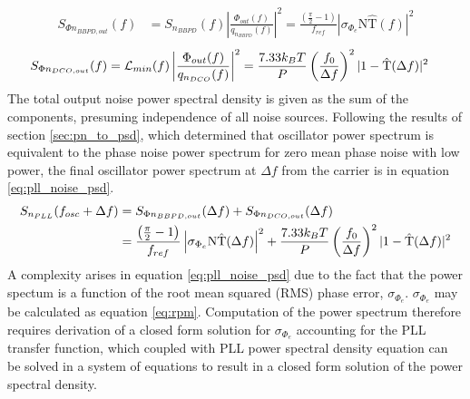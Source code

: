 		\begin{align}\label{eq:out_psd_bbpd_pll}
			S_{\Phi n_{BBPD,out}}(f) &= S_{n_{BBPD}}(f)\left|\frac{\Phi_{out}(f)}{q_{n_{BBPD}}(f)}\right|^2 = \frac{\left(\frac{\pi}{2}-1\right)}{f_{ref}}\left|\sigma_{\Phi_e}\mathrm{N}\hat{\mathrm{T}}(f)\right|^2
		\end{align}
		\begin{align}\label{eq:out_psd_dco_pll}
			S_{\Phi n_{DCO,out}}(f) &= \mathcal{L}_{min}(f)\left|\frac{\Phi_{out}(f)}{q_{n_{DCO}}(f)}\right|^2 = \frac{7.33k_BT}{P}\left(\frac{f_0}{\Delta f}\right)^2|1-\hat{\textnormal{T}}(\Delta f)|^2 
		\end{align}
		The total output noise power spectral density is given as the sum of the components, presuming independence of all noise sources. Following the results of section \ref{sec:pn_to_psd}, which determined that oscillator power spectrum is equivalent to the phase noise power spectrum for zero mean phase noise with low power, the final oscillator power spectrum at $\Delta f$ from the carrier is in equation \ref{eq:pll_noise_psd}.
		\begin{align}
			S_{n_{PLL}}(f_{osc} + \Delta f) &= S_{\Phi n_{BBPD,out}}(\Delta f) + S_{\Phi n_{DCO,out}}(\Delta f)\label{eq:pll_noise_psd}\\
			&= \frac{\left(\frac{\pi}{2}-1\right)}{f_{ref}}\left|\sigma_{\Phi_e}\mathrm{N}\hat{\mathrm{T}}(\Delta f)\right|^2 + \frac{7.33k_BT}{P}\left(\frac{f_0}{\Delta f}\right)^2|1-\hat{\textnormal{T}}({\Delta f})|^2
		\end{align}
		A complexity arises in equation \ref{eq:pll_noise_psd} due to the fact that the power spectum is a function of the root mean squared (RMS) phase error, $\sigma_{\Phi_e}$. $\sigma_{\Phi_e}$ may be calculated as equation \ref{eq:rpm}. Computation of the power spectrum therefore requires derivation of a closed form solution for $\sigma_{\Phi_e}$ accounting for the PLL transfer function, which coupled with PLL power spectral density equation can be solved in a system of equations to result in a closed form solution of the power spectral density. 


